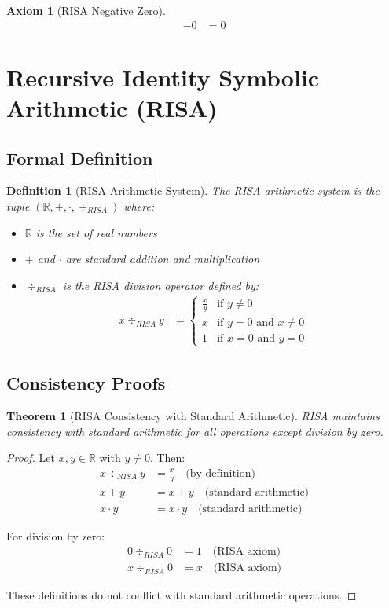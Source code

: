 \documentclass[12pt,a4paper]{article}
\newtheorem{axiom}{Axiom}
\newtheorem{definition}{Definition}
\newtheorem{theorem}{Theorem}
\begin{document}
\begin{axiom}[RISA Negative Zero]
\begin{align}
-0 &= 0
\end{align}
\end{axiom}

\section{Recursive Identity Symbolic Arithmetic (RISA)}

\subsection{Formal Definition}

\begin{definition}[RISA Arithmetic System]
The RISA arithmetic system is the tuple $(\mathbb{R}, +, \cdot, \div_{RISA})$ where:
\begin{itemize}
\item $\mathbb{R}$ is the set of real numbers
\item $+$ and $\cdot$ are standard addition and multiplication
\item $\div_{RISA}$ is the RISA division operator defined by:
\begin{align}
x \div_{RISA} y &= \begin{cases}
\frac{x}{y} & \text{if } y \neq 0 \\
x & \text{if } y = 0 \text{ and } x \neq 0 \\
1 & \text{if } x = 0 \text{ and } y = 0
\end{cases}
\end{align}
\end{itemize}
\end{definition}

\subsection{Consistency Proofs}

\begin{theorem}[RISA Consistency with Standard Arithmetic]
RISA maintains consistency with standard arithmetic for all operations except division by zero.
\end{theorem}

\begin{proof}
Let $x, y \in \mathbb{R}$ with $y \neq 0$. Then:
\begin{align}
x \div_{RISA} y &= \frac{x}{y} \quad \text{(by definition)} \\
x + y &= x + y \quad \text{(standard arithmetic)} \\
x \cdot y &= x \cdot y \quad \text{(standard arithmetic)}
\end{align}

For division by zero:
\begin{align}
0 \div_{RISA} 0 &= 1 \quad \text{(RISA axiom)} \\
x \div_{RISA} 0 &= x \quad \text{(RISA axiom)}
\end{align}

These definitions do not conflict with standard arithmetic operations.
\end{proof}
\end{document}
